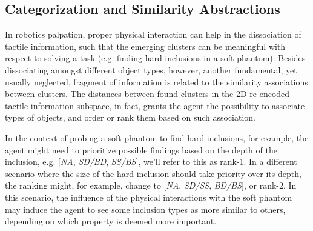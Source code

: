 \subsection{Categorization and Similarity Abstractions}
In robotics palpation, proper physical interaction can help in the dissociation 
of tactile information, such that the emerging clusters can be meaningful 
with respect to solving a task (e.g. finding hard inclusions in a soft phantom). 
Besides dissociating amongst different object types, however, another fundamental, yet usually neglected, 
fragment of information is related to the similarity associations between clusters. The distances 
between found clusters in the 2D re-encoded tactile information subspace, in fact, grants the agent 
the possibility to associate types of objects, and order or rank them based on such association.

In the context of probing a soft phantom to find hard inclusions, for example, the agent might need to 
prioritize possible findings based on the depth of the inclusion, e.g. $[$\textit{NA}, \textit{SD/BD}, 
\textit{SS/BS}$]$, we'll refer to this as rank-1. In a different scenario where the size of the hard 
inclusion should take priority over its depth, the ranking might, for example, change to 
$[$\textit{NA}, \textit{SD/SS}, \textit{BD/BS}$]$, or rank-2. In this scenario, the influence of 
the physical interactions with the soft phantom may induce the agent to see some inclusion 
types as more similar to others, depending on which property is deemed more important.

